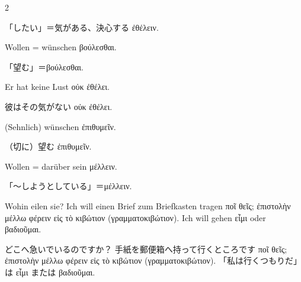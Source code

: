 \begin{paracol}{2}
\begin{enumerate}[leftmargin=0pt,rightmargin=0pt,listparindent =1cm,labelindent=1cm,labelsep=1ex,labelwidth={*},itemindent={*},align=left]
\begin{japanese}
「したい」＝気がある、決心する \textgreek[variant=ancient]{ἐθέλειν.}
\end{japanese}
\switchcolumn*

\begin{continuousitemline}
\begin{german}
Wollen = wünschen \textgreek[variant=ancient]{βούλεσθαι.}
\end{german}
\switchcolumn

\begin{japanese}
「望む」＝\textgreek[variant=ancient]{βούλεσθαι.}
\end{japanese}
\switchcolumn*

\begin{german}
Er hat keine Lust \textgreek[variant=ancient]{οὐκ ἐθέλει.}
\end{german}
\switchcolumn

\begin{japanese}
彼はその気がない \textgreek[variant=ancient]{οὐκ ἐθέλει.}
\end{japanese}
\switchcolumn*

\begin{german}
(Sehnlich) wünschen \textgreek[variant=ancient]{ἐπιθυμεῖν. }
\end{german}
\switchcolumn

\begin{japanese}
（切に）望む \textgreek[variant=ancient]{ἐπιθυμεῖν.}
\end{japanese}
\switchcolumn*

\begin{german}
Wollen = darüber sein \textgreek[variant=ancient]{μέλλειν.}
\end{german}
\switchcolumn

\begin{japanese}
「〜しようとしている」＝\textgreek[variant=ancient]{μέλλειν.}
\end{japanese}
\switchcolumn*

\end{continuousitemline}


\begin{german}
Wohin eilen sie? Ich will einen Brief zum Briefkasten tragen \textgreek[variant=ancient]{ποῖ
θεῖς; ἐπιστολὴν μέλλω φέρειν εἰς τὸ κιβώτιον (γραμματοκιβώτιον). Ich
will gehen εἶμι oder βαδιοῦμαι.} 
\end{german}
\switchcolumn

\begin{japanese}
どこへ急いでいるのですか？ 手紙を郵便箱へ持って行くところです
\textgreek[variant=ancient]{ποῖ θεῖς; ἐπιστολὴν μέλλω φέρειν εἰς τὸ κιβώτιον (γραμματοκιβώτιον).}
「私は行くつもりだ」は \textgreek[variant=ancient]{εἶμι} または \textgreek[variant=ancient]{βαδιοῦμαι.}
\end{japanese}
\switchcolumn*


\end{enumerate}
\end{paracol}
